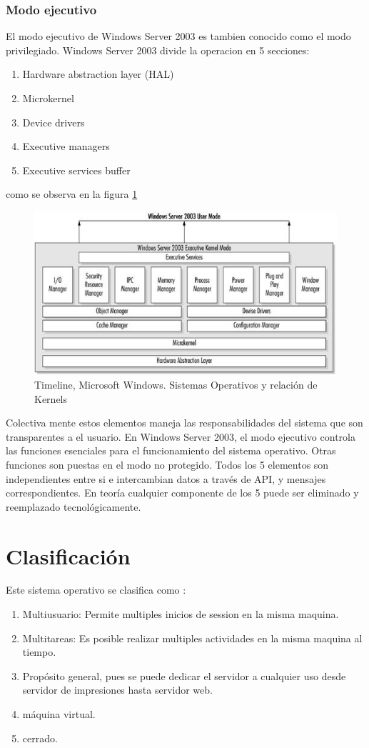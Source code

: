 \documentclass[paper=a4, fontsize=12pt]{article} 		%
\numberwithin{equation}{section}						%
\numberwithin{table}{section} 							%
\begin{document}
\subsubsection{Modo ejecutivo}
El modo ejecutivo de Windows Server 2003 es tambien conocido como el modo privilegiado. Windows Server 2003 divide la operacion en 5 secciones: 
\begin{enumerate}
\item Hardware abstraction layer (HAL)
\item Microkernel
\item Device drivers
\item Executive managers
\item Executive services buffer
\end{enumerate}
como se observa en la figura \ref{fig:kernel}
\begin{center}
\begin{figure}[H]
\includegraphics[scale=0.9]{imgs/kernel.jpg}
\caption{Timeline, Microsoft Windows. Sistemas Operativos y relación de Kernels}
\label{fig:kernel}
\end{figure}
\end{center}
Colectiva mente estos elementos maneja las responsabilidades del sistema que son transparentes a el usuario. En Windows Server 2003, el modo ejecutivo controla las funciones esenciales para el funcionamiento del sistema operativo. Otras funciones son puestas en el modo no protegido. Todos los 5 elementos son independientes entre si e intercambian datos a través de API, y mensajes correspondientes. En teoría cualquier componente de los 5 puede ser eliminado y reemplazado tecnológicamente.
\newpage
\section{Clasificación}
Este sistema operativo se clasifica como :
\begin{enumerate}
\item Multiusuario:  Permite multiples inicios de session en la misma maquina. 
\item Multitareas: Es posible realizar multiples actividades en la misma maquina al tiempo.
\item Propósito general, pues se puede dedicar el servidor a cualquier  uso desde servidor de impresiones hasta servidor web.
\item máquina virtual.
\item cerrado. 
\end{enumerate}
\end{document}
